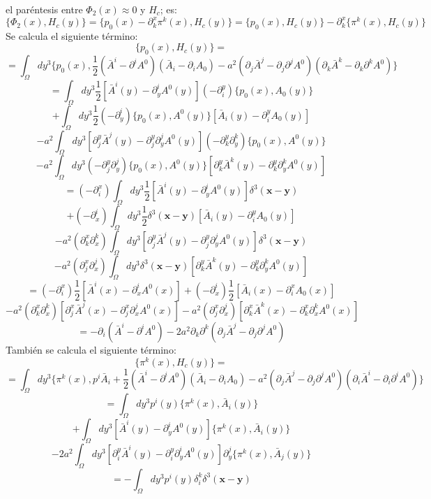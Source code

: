 \documentclass[a4paper,12pt]{article}
\begin{document}
\begin{enumerate}
el paréntesis entre  $\Phi_2(x)\approx0$ y $H_c$; es:
$$\{\Phi_2(x),H_c(y)\}=\{p_0(x)-\partial_k^x\pi^k(x),H_c(y)\}=\{p_0(x),H_c(y)\}-\partial_k^x\{\pi^k(x),H_c(y)\}$$
Se calcula el siguiente término:
\begin{equation}
\{p_0(x),H_c(y)\}= 
\end{equation}
$$=\int_{\Omega}dy^3\{p_0(x),\frac{1}{2}(\bar{A}^i-\partial^i A^0)(\bar{A}_i-\partial_i A_0)-a^2(\partial_j\bar{A}^j-\partial_j\partial^jA^0)(\partial_k\bar{A}^k-\partial_k\partial^kA^0)\}$$
$$=\int_{\Omega}dy^3\frac{1}{2}[\bar{A}^i(y)-\partial^i_y A^0(y)](-\partial_i^y)\{p_0(x),A_0(y)\}$$
$$+\int_{\Omega}dy^3\frac{1}{2}(-\partial^i_y)\{p_0(x), A^0(y)\}[\bar{A}_i(y)-\partial_i^y A_0(y)]$$
$$-a^2\int_{\Omega}dy^3[\partial_j^y\bar{A}^j(y)-\partial_j^y\partial^j_yA^0(y)](-\partial_k^y\partial^k_y)\{p_0(x),A^0(y)\}$$
$$-a^2\int_{\Omega}dy^3(-\partial_j^y\partial^j_y)\{p_0(x),A^0(y)\}[\partial_k^y\bar{A}^k(y)-\partial_k^y\partial^k_yA^0(y)]$$
$$=(-\partial_i^x)\int_{\Omega}dy^3\frac{1}{2}[\bar{A}^i(y)-\partial^i_y A^0(y)]\delta^3(\textbf{x}-\textbf{y}) $$
$$+(-\partial^i_x)\int_{\Omega}dy^3\frac{1}{2}\delta^3(\textbf{x}-\textbf{y})[\bar{A}_i(y)-\partial_i^y A_0(y)]$$
$$-a^2(\partial_k^x\partial^k_x)\int_{\Omega}dy^3[\partial_j^y\bar{A}^j(y)-\partial_j^y\partial^j_yA^0(y)]\delta^3(\textbf{x}-\textbf{y})$$
$$-a^2(\partial_j^x\partial^j_x)\int_{\Omega}dy^3\delta^3(\textbf{x}-\textbf{y})[\partial_k^y\bar{A}^k(y)-\partial_k^y\partial^k_yA^0(y)]$$
$$=(-\partial_i^x)\frac{1}{2}[\bar{A}^i(x)-\partial^i_x A^0(x)]+(-\partial^i_x)\frac{1}{2}[\bar{A}_i(x)-\partial_i^x A_0(x)]$$
$$-a^2(\partial_k^x\partial^k_x)[\partial_j^x\bar{A}^j(x)-\partial_j^x\partial^j_xA^0(x)]-a^2(\partial_j^x\partial^j_x)[\partial_k^x\bar{A}^k(x)-\partial_k^x\partial^k_xA^0(x)]$$
$$=-\partial_i(\bar{A}^i-\partial^iA^0)-2a^2\partial_k\partial^k(\partial_j\bar{A}^j-\partial_j\partial^jA^0)$$
También se calcula el siguiente término:
\begin{equation}
\{\pi^k(x),H_c(y)\}= 
\end{equation}
{\small
$$=\int_{\Omega}dy^3\{\pi^k(x),p^{i}\bar{A}_i+\frac{1}{2}(\bar{A}^i-\partial^i A^0)(\bar{A}_i-\partial_i A_0)-a^2(\partial_j\bar{A}^j-\partial_j\partial^jA^0)(\partial_i\bar{A}^i-\partial_i\partial^iA^0)\}$$}
$$=\int_{\Omega}dy^3p^{i}(y)\{\pi^k(x),\bar{A}_i(y)\}$$
$$+\int_{\Omega}dy^3[\bar{A}^i(y)-\partial^i_y A^0(y)]\{\pi^k(x),\bar{A}_i(y)\}$$
$$-2a^2\int_{\Omega}dy^3[\partial_i^y\bar{A}^i(y)-\partial_i^y\partial^i_yA^0(y)]\partial^j_y\{\pi^k(x),\bar{A}_j(y)\}$$
$$=-\int_{\Omega}dy^3p^{i}(y)\delta^k_i\delta^3(\textbf{x}-\textbf{y})$$

\end{enumerate}
\end{document}
